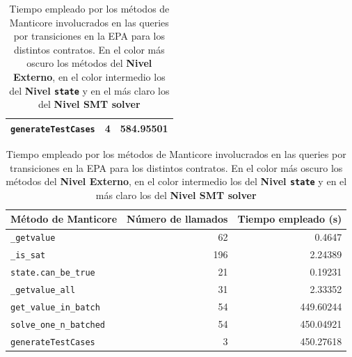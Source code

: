 \begin{table}[ht]
\begin{minipage}{0.95\textwidth}
\begin{tabular}[t]{l @{\hskip 30pt} r @{\hskip 30pt} r}
            \rowcolor{color3} \texttt{generateTestCases}      & 4                           & 584.95501                    \\
            \bottomrule
        \end{tabular}
        \caption{Tiempo empleado por los métodos de Manticore para el contrato \texttt{RoomThermostat}.}
        \label{tab:performance-RoomThermostat}
    \end{minipage}
    \begin{minipage}{0.95\textwidth}
        \centering
        \begin{tabular}[t]{l @{\hskip 30pt} r @{\hskip 30pt} r}
            \toprule
            \textbf{Método de Manticore}                      & \textbf{Número de llamados} & \textbf{Tiempo empleado (s)} \\
            \midrule
            \rowcolor{color1} \texttt{\_getvalue}             & 62                          & 0.4647                       \\
            \rowcolor{color1} \texttt{\_is\_sat}              & 196                         & 2.24389                      \\
            \rowcolor{color2} \texttt{state.can\_be\_true}    & 21                          & 0.19231                      \\
            \rowcolor{color1} \texttt{\_getvalue\_all}        & 31                          & 2.33352                      \\
            \rowcolor{color2} \texttt{get\_value\_in\_batch}  & 54                          & 449.60244                    \\
            \rowcolor{color2} \texttt{solve\_one\_n\_batched} & 54                          & 450.04921                    \\
            \rowcolor{color3} \texttt{generateTestCases}      & 3                           & 450.27618                    \\
            \bottomrule
        \end{tabular}
        \caption{Tiempo empleado por los métodos de Manticore para el contrato \texttt{BasicProvenance}.}
        \label{tab:performance-BasicProvenance}
    \end{minipage}
    \caption*{Tiempo empleado por los métodos de Manticore involucrados en las queries por transiciones en la EPA para los distintos contratos. En el color más oscuro los métodos del \textbf{Nivel Externo}, en el color intermedio los del \textbf{Nivel \texttt{state}} y en el más claro los del \textbf{Nivel SMT solver}}
\end{table}
